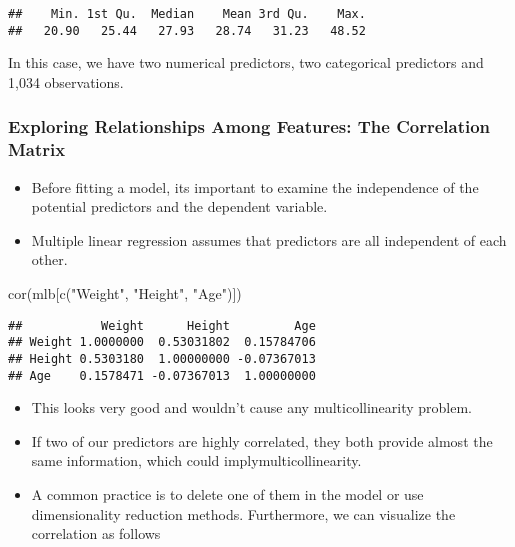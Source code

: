 \documentclass[
]{article}
\newenvironment{Shaded}{\begin{snugshade}}{\end{snugshade}}
\newcommand{\FunctionTok}[1]{\textcolor[rgb]{0.00,0.00,0.00}{#1}}
\newcommand{\NormalTok}[1]{#1}
\newcommand{\StringTok}[1]{\textcolor[rgb]{0.31,0.60,0.02}{#1}}
\providecommand{\tightlist}{%
  \setlength{\itemsep}{0pt}\setlength{\parskip}{0pt}}
\begin{document}
\begin{verbatim}
##    Min. 1st Qu.  Median    Mean 3rd Qu.    Max. 
##   20.90   25.44   27.93   28.74   31.23   48.52
\end{verbatim}

In this case, we have two numerical predictors, two categorical
predictors and 1,034 observations.

\hypertarget{exploring-relationships-among-features-the-correlation-matrix}{%
\subsubsection{Exploring Relationships Among Features: The Correlation
Matrix}\label{exploring-relationships-among-features-the-correlation-matrix}}

\begin{itemize}
\tightlist
\item
  Before fitting a model, its important to examine the independence of
  the potential predictors and the dependent variable.
\item
  Multiple linear regression assumes that predictors are all independent
  of each other.
\end{itemize}

\begin{Shaded}
\begin{Highlighting}[]
\FunctionTok{cor}\NormalTok{(mlb[}\FunctionTok{c}\NormalTok{(}\StringTok{"Weight"}\NormalTok{, }\StringTok{"Height"}\NormalTok{, }\StringTok{"Age"}\NormalTok{)])}
\end{Highlighting}
\end{Shaded}

\begin{verbatim}
##           Weight      Height         Age
## Weight 1.0000000  0.53031802  0.15784706
## Height 0.5303180  1.00000000 -0.07367013
## Age    0.1578471 -0.07367013  1.00000000
\end{verbatim}

\begin{itemize}
\tightlist
\item
  This looks very good and wouldn't cause any multicollinearity problem.
\item
  If two of our predictors are highly correlated, they both provide
  almost the same information, which could implymulticollinearity.
\item
  A common practice is to delete one of them in the model or use
  dimensionality reduction methods. Furthermore, we can visualize the
  correlation as follows
\end{itemize}
\end{document}
